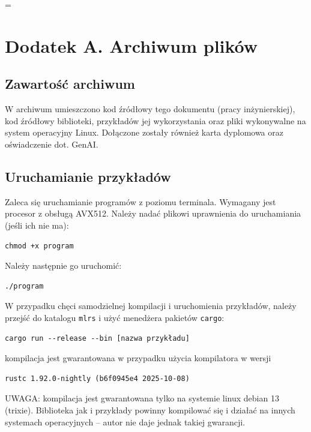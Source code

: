 
{
\hfuzz=\maxdimen
{}
\printbibliography[title = {Bibliografia}]
}

\newpage
\listoffigures

\newpage
{} %
\listofalgorithms

\pagebreak
{} %
\pagestyle{empty}
\section*{Dodatek A. Archiwum plików}
\subsection*{Zawartość archiwum}
W archiwum umieszczono kod źródłowy tego dokumentu (pracy inżynierskiej),
kod źródłowy biblioteki,
przykładów jej wykorzystania oraz pliki wykonywalne na system operacyjny Linux.
Dołączone zostały również karta dyplomowa oraz oświadczenie dot. GenAI.
\subsection*{Uruchamianie przykładów}
Zaleca się uruchamianie programów z poziomu terminala. Wymagany jest procesor
z obsługą AVX512. Należy nadać plikowi uprawnienia do uruchamiania (jeśli ich nie ma):
\begin{verbatim}
chmod +x program
\end{verbatim}
Należy następnie go uruchomić:
\begin{verbatim}
./program
\end{verbatim}
W przypadku chęci samodzielnej kompilacji i uruchomienia przykładów, należy
przejść do katalogu \texttt{mlrs} i użyć menedżera pakietów
\texttt{cargo}:
\begin{verbatim}
cargo run --release --bin [nazwa przykładu]
\end{verbatim}
kompilacja jest gwarantowana w przypadku użycia kompilatora w wersji
\begin{verbatim}
rustc 1.92.0-nightly (b6f0945e4 2025-10-08)
\end{verbatim}
UWAGA: kompilacja jest gwarantowana tylko na systemie linux debian 13 (trixie).
Biblioteka jak i przykłady powinny kompilować się i działać na innych systemach operacyjnych
-- autor nie daje jednak takiej gwarancji.

